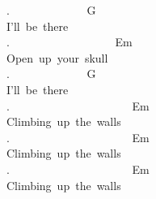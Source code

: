{. \ \ \ \ \ \ \ \ \ \ \ \ \ G\\
I'll\ be\ there\\
. \ \ \ \ \ \ \ \ \ \ \ \ \ \ \ \ \ \ Em\\
Open\ up\ your\ skull\\
. \ \ \ \ \ \ \ \ \ \ \ \ \ G\\
I'll\ be\ there\\
. \ \ \ \ \ \ \ \ \ \ \ \ \ \ \ \ \ \ \ \ \ Em\\
Climbing\ up\ the\ walls\\
. \ \ \ \ \ \ \ \ \ \ \ \ \ \ \ \ \ \ \ \ \ Em\\
Climbing\ up\ the\ walls\\
. \ \ \ \ \ \ \ \ \ \ \ \ \ \ \ \ \ \ \ \ \ Em\\
Climbing\ up\ the\ walls}
